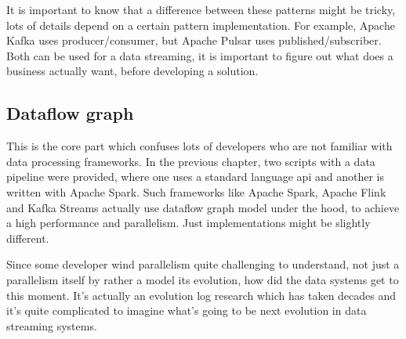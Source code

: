 It is important to know that a difference between these patterns might be tricky,
lots of details depend on a certain pattern implementation.
For example, Apache Kafka uses producer/consumer, but Apache Pulsar uses published/subscriber.
Both can be used for a data streaming, it is important to figure out what does a business
actually want, before developing a solution.

\subsection{Dataflow graph}\label{subsec:dataflow-graph}
This is the core part which confuses lots of developers who are not familiar
with data processing frameworks.
In the previous chapter, two scripts with a data pipeline were provided, where
one uses a standard language api and another is written with Apache Spark.
Such frameworks like Apache Spark, Apache Flink and Kafka Streams actually
use dataflow graph model under the hood, to achieve a high performance and parallelism.
Just implementations might be slightly different.

Since some developer wind parallelism quite challenging to
understand, not just a parallelism itself by rather a model
its evolution, how did the data systems get to this moment.
It's actually an evolution log research which has taken decades and
it's quite complicated to imagine what's going to be next evolution
in data streaming systems.

